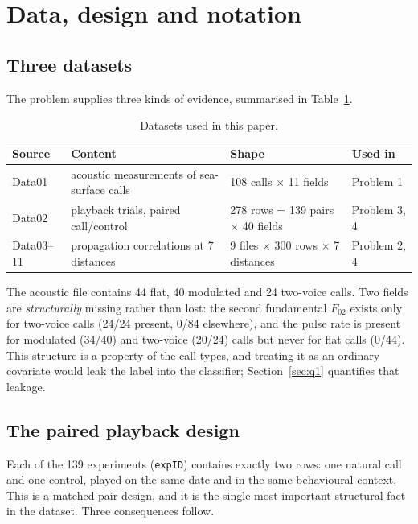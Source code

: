 \section{Data, design and notation}\label{sec:data}

\subsection{Three datasets}

The problem supplies three kinds of evidence, summarised in Table~\ref{tab:data}.

\begin{table}[htbp]
  \centering
  \caption{Datasets used in this paper.}\label{tab:data}
  \small
  \begin{tabular}{llll}
    \toprule
    Source & Content & Shape & Used in \\
    \midrule
    Data01 & acoustic measurements of sea-surface calls & 108 calls $\times$ 11 fields & Problem 1 \\
    Data02 & playback trials, paired call/control & 278 rows = 139 pairs $\times$ 40 fields & Problem 3, 4 \\
    Data03--11 & propagation correlations at 7 distances & 9 files $\times$ 300 rows $\times$ 7 distances & Problem 2, 4 \\
    \bottomrule
  \end{tabular}
\end{table}

The acoustic file contains 44 flat, 40 modulated and 24 two-voice calls. Two fields are
\emph{structurally} missing rather than lost: the second fundamental $F_{02}$ exists only for
two-voice calls (24/24 present, 0/84 elsewhere), and the pulse rate is present for modulated
(34/40) and two-voice (20/24) calls but never for flat calls (0/44). This structure is a
property of the call types, and treating it as an ordinary covariate would leak the label into
the classifier; Section~\ref{sec:q1} quantifies that leakage.

\subsection{The paired playback design}\label{sec:paired}

Each of the 139 experiments (\texttt{expID}) contains exactly two rows: one natural call and one
control, played on the same date and in the same behavioural context. This is a matched-pair
design, and it is the single most important structural fact in the dataset. Three consequences
follow.

